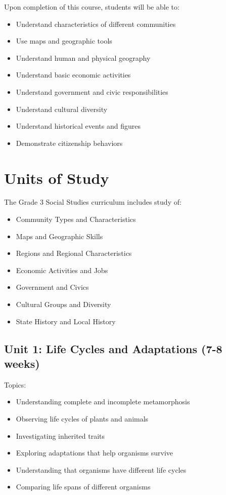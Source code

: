\documentclass[11pt,letterpaper]{report}
\begin{document}
Upon completion of this course, students will be able to:

\begin{itemize}
    \item Understand characteristics of different communities
    \item Use maps and geographic tools
    \item Understand human and physical geography
    \item Understand basic economic activities
    \item Understand government and civic responsibilities
    \item Understand cultural diversity
    \item Understand historical events and figures
    \item Demonstrate citizenship behaviors
\end{itemize}

\section{Units of Study}

The Grade 3 Social Studies curriculum includes study of:

\begin{itemize}
    \item Community Types and Characteristics
    \item Maps and Geographic Skills
    \item Regions and Regional Characteristics
    \item Economic Activities and Jobs
    \item Government and Civics
    \item Cultural Groups and Diversity
    \item State History and Local History
\end{itemize}

\subsection{Unit 1: Life Cycles and Adaptations (7-8 weeks)}

Topics:
\begin{itemize}
\item Understanding complete and incomplete metamorphosis
\item Observing life cycles of plants and animals
\item Investigating inherited traits
\item Exploring adaptations that help organisms survive
\item Understanding that organisms have different life cycles
\item Comparing life spans of different organisms
\end{itemize}
\end{document}
